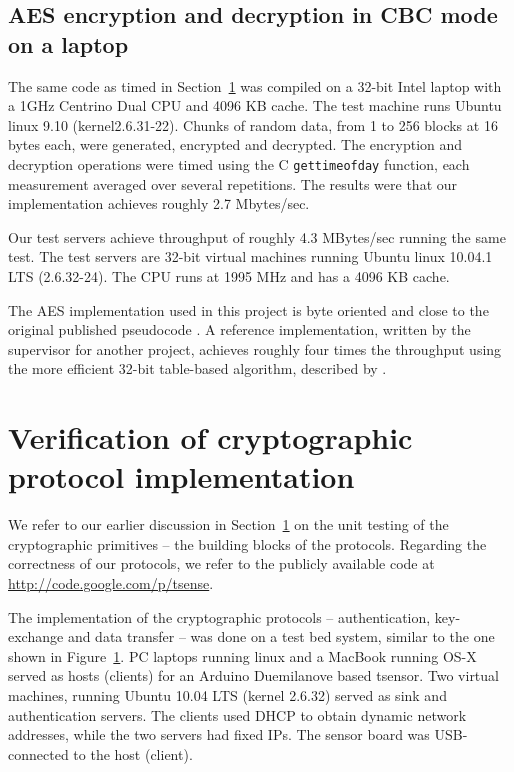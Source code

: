 \subsection{AES encryption and decryption in CBC mode on a laptop}

The same code as timed in Section~\ref{} was compiled on a 32-bit Intel laptop with a 1GHz Centrino Dual CPU and 4096 KB cache. The test machine runs Ubuntu linux 9.10 (kernel2.6.31-22). Chunks of random data, from 1 to 256 blocks at 16 bytes each, were generated, encrypted and decrypted. The encryption and decryption operations were timed using the C \texttt{gettimeofday} function, each measurement averaged over several repetitions. The results were that our implementation achieves roughly 2.7 Mbytes/sec.

Our test servers achieve throughput of roughly 4.3 MBytes/sec running the same test. The test servers are 32-bit virtual machines running Ubuntu linux 10.04.1 LTS (2.6.32-24). The CPU runs at 1995 MHz and has a 4096 KB cache.

The AES implementation used in this project is byte oriented and close to the original published pseudocode . A reference implementation, written by the supervisor for another project, achieves roughly four times the throughput using the more efficient 32-bit table-based algorithm, described by .

\section{Verification of cryptographic protocol implementation}

We refer to our earlier discussion in Section~\ref{} on the unit testing of the cryptographic primitives -- the building blocks of the protocols. Regarding the correctness of our protocols, we refer to the publicly available code at \url{http://code.google.com/p/tsense}.

The implementation of the cryptographic protocols -- authentication, key-exchange and data transfer -- was done on a test bed system, similar to the one shown in Figure~\ref{}. PC laptops running linux and a MacBook running OS-X served as hosts (clients) for an Arduino Duemilanove based tsensor. Two virtual machines, running Ubuntu 10.04 LTS (kernel 2.6.32) served as sink and authentication servers. The clients used DHCP to obtain dynamic network addresses, while the two servers had fixed IPs. The sensor board was USB-connected to the host (client).

